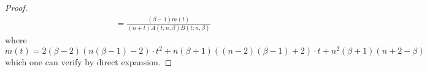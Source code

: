 \documentclass[10pt,a4paper]{amsart}
\newcommand{\p}{\partial}
\begin{document}
\begin{proof}
\begin{align*}
    &=\frac{(\beta-1)m(t)}{(n+t)A(t;n,\beta)B(t;n,\beta)}
\end{align*}
where 
\begin{equation}
    m(t)=2(\beta-2)(n(\beta-1)-2)\cdot t^2 +n(\beta+1)((n-2)(\beta-1)+2)\cdot t+n^2(\beta+1)(n+2-\beta)
\end{equation}
which one can verify by direct expansion.

\end{proof}
\end{document}
